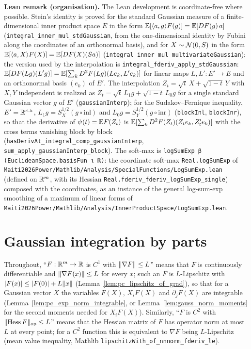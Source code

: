 \textbf{Lean remark (organisation).} The Lean development is coordinate-free where possible.
Stein's identity is proved for the standard Gaussian measure of a finite-dimensional inner
product space $E$ in the form $\mathbb{E}[\langle a, g \rangle F(g)] = \mathbb{E}[DF(g)\,a]$
(\texttt{integral\_inner\_mul\_stdGaussian}, from the one-dimensional identity by Fubini along
the coordinates of an orthonormal basis), and for $X\sim\mathcal{N}(0,S)$ in the form
$\mathbb{E}[\langle a, X \rangle F(X)] = \mathbb{E}[DF(X)(Sa)]$ (\texttt{integral\_inner\_mul\_multivariateGaussian}); the
version used by the interpolation is \texttt{integral\_fderiv\_apply\_stdGaussian}:
$\mathbb{E}[DF(Lg)(L'g)] = \mathbb{E}[\sum_k D^2F(Lg)(Le_k, L'e_k)]$ for linear maps $L, L' : E'\to E$ and an
orthonormal basis $(e_k)$ of $E'$. The interpolation $Z_t = \sqrt t\,X + \sqrt{1-t}\,Y$ with
$X, Y$ independent is realized as $Z_t = \sqrt t\,L_1 g + \sqrt{1-t}\,L_0 g$ for a single
standard Gaussian vector $g$ of $E'$ (\texttt{gaussianInterp}); for the Sudakov--Fernique
inequality, $E' = \mathbb{R}^{\iota\sqcup\iota}$, $L_1 g = S_X^{1/2}(g\circ\mathrm{inl})$ and
$L_0 g = S_Y^{1/2}(g\circ\mathrm{inr})$ (\texttt{blockInl}, \texttt{blockInr}), so that the
derivative of $\psi(t) = \mathbb{E} F(Z_t)$ is
$\mathbb{E}[\sum_k D^2F(Z_t)(Z_te_k, Z_t'e_k)]$ with the cross terms vanishing block by block
(\texttt{hasDerivAt\_integral\_comp\_gaussianInterp}, \texttt{sum\_apply\_gaussianInterp\_block}).
The soft-max is \texttt{logSumExp β (EuclideanSpace.basisFun ι ℝ)}: the coordinate soft-max
\texttt{Real.logSumExp} of \texttt{Maiti2026Power/Mathlib/Analysis/SpecialFunctions/LogSumExp.lean}
(defined on $\mathbb{R}^m$, with its Hessian \texttt{Real.fderiv\_fderiv\_logSumExp\_single}) composed
with the coordinates, as an instance of the general log-sum-exp smoothing of a maximum of linear
forms of \texttt{Maiti2026Power/Mathlib/Analysis/InnerProductSpace/LogSumExp.lean}.

\section{Gaussian integration by parts}
\label{sec:pre_sudakov_stein}

Throughout, ``$F : \mathbb{R}^m\to\mathbb{R}$ is $C^1$ with $\lVert \nabla F \rVert\le L$'' means that $F$ is
continuously differentiable and $\lVert \nabla F(x) \rVert\le L$ for every $x$; such an $F$ is
$L$-Lipschitz with $\lvert F(x) \rvert\le\lvert F(0) \rvert+L\lVert x \rVert$ (Lemma~\ref{lem:pc_lipschitz_of_grad}),
so that for a Gaussian vector $X$ the variables $F(X)$, $X_iF(X)$ and $\partial_jF(X)$ are
integrable (Lemma~\ref{lem:pc_exp_norm_integrable}, or Lemma~\ref{lem:gauss_norm_moments}
for the second moments needed for $X_iF(X)$). Similarly, ``$F$ is $C^2$ with
$\lVert \mathrm{Hess}\,F \rVert_{\mathrm{op}}\le L$'' means that the Hessian matrix of $F$ has
operator norm at most $L$ at every point; for a $C^2$ function this is equivalent to $\nabla F$
being $L$-Lipschitz (mean value inequality, Mathlib
\texttt{lipschitzWith\_of\_nnnorm\_fderiv\_le}).

